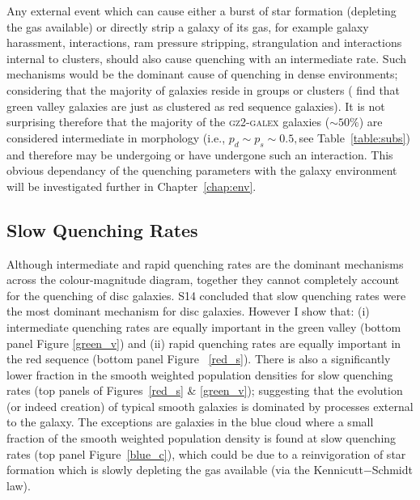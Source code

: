 Any external event which can cause either a burst of star formation (depleting the gas available) or directly strip a galaxy of its gas, for example galaxy harassment, interactions, ram pressure stripping, strangulation and interactions internal to clusters, should also cause quenching with an intermediate rate. Such mechanisms would be the dominant cause of quenching in dense environments; considering that the majority of galaxies reside in groups or clusters (\citealt{Coil08} find that green valley galaxies are just as clustered as red sequence galaxies). It is not surprising therefore that the majority of the \textsc{gz2-galex} galaxies ($\sim50\%$) are considered intermediate in morphology (i.e., $p_d \sim p_s \sim 0.5, $see Table~\ref{table:subs}) and therefore may be undergoing or have undergone such an interaction. This obvious dependancy of the quenching parameters with the galaxy environment will be investigated further in Chapter~\ref{chap:env}.


\subsection{Slow Quenching Rates}\label{slow}
Although intermediate and rapid quenching rates are the dominant mechanisms across the colour-magnitude diagram, together they cannot completely account for the quenching of disc galaxies. S14 concluded that slow quenching rates were the most dominant mechanism for disc galaxies. However I show that: (i) intermediate quenching rates are equally important in the green valley (bottom panel Figure \ref{green_v}) and (ii) rapid quenching rates are equally important in the red sequence (bottom panel Figure ~\ref{red_s}). There is also a significantly lower fraction in the smooth weighted population densities for slow quenching rates (top panels of Figures~\ref{red_s} \& \ref{green_v}); suggesting that the evolution (or indeed creation) of typical smooth galaxies is dominated by processes external to the galaxy. The exceptions are galaxies in the blue cloud where a small fraction of the smooth weighted population density is found at slow quenching rates (top panel Figure~\ref{blue_c}), which could be due to a reinvigoration of star formation which is slowly depleting the gas available (via the Kennicutt$-$Schmidt law).

